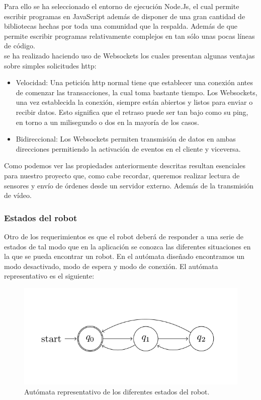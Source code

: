 Para ello se ha seleccionado el entorno de ejecución Node.Js, el cual permite escribir programas en JavaScript además de disponer de una gran cantidad de bibliotecas hechas por toda una comunidad que la respalda.
Además de que permite escribir programas relativamente complejos en tan sólo unas pocas líneas de código.\\

se ha realizado haciendo uso de Websockets los cuales presentan algunas ventajas sobre simples solicitudes http:

\begin{itemize}
 \item Velocidad: Una petición http normal tiene que establecer una conexión antes de comenzar las transacciones, la cual toma bastante tiempo. 
 Los Websockets, una vez establecida la conexión, siempre están abiertos y listos para enviar o recibir datos. Esto significa que el retraso puede ser tan bajo como su ping,
 en torno a un milisegundo o dos en la mayoría de los casos.
 \item Bidireccional: Los Websockets permiten transmisión de datos en ambas direcciones permitiendo la activación de eventos en el cliente y viceversa.
\end{itemize}

Como podemos ver las propiedades anteriormente descritas resultan esenciales para nuestro proyecto que, como cabe recordar, queremos realizar lectura de sensores y envío de órdenes desde un servidor 
externo. Además de la transmisión de vídeo.\\

\subsubsection{Estados del robot}

Otro de los requerimientos es que el robot deberá de responder a una serie de estados de tal modo que en la aplicación se conozca las diferentes situaciones en la que se pueda encontrar un robot.
En el autómata diseñado encontramos un modo desactivado, modo de espera y modo de conexión. El autómata representativo es el siguiente:\\

\begin{figure}[H]
  \begin{center}
    \includegraphics[scale=0.6]{imagenes/robot/automata-estados.png}
  \end{center}
  \caption{Autómata representativo de los diferentes estados del robot.}
  \label{figura:automata-estados}
\end{figure}

